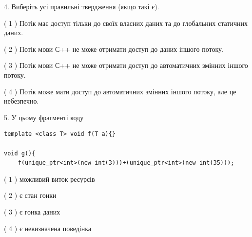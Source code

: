 \documentclass[12pt, ukrainian]{article}
\begin{document}
\begin {large}
{%
4. Виберіть усі правильні твердження (якщо такі є).\par
\vspace{2mm}

( 1 ) Потік має доступ тільки до своїх власних даних та до глобальних статичних даних.%

( 2 ) Потік мови С++ не може отримати доступ до даних іншого потоку.%

( 3 ) Потік мови С++ не може отримати доступ до автоматичних змінних іншого потоку.%

( 4 ) Потік може мати доступ до автоматичних змінних іншого потоку, але це небезпечно.%


5. У цьому фрагменті коду
\begin{verbatim}
template <class T> void f(T a){}

void g(){
    f(unique_ptr<int>(new int(3)))+(unique_ptr<int>(new int(35)));
\end{verbatim}

( 1 ) можливий виток ресурсів%

( 2 ) є стан гонки%

( 3 ) є гонка даних%

( 4 ) є невизначена поведінка%
}
\end {large}
\end{document}
